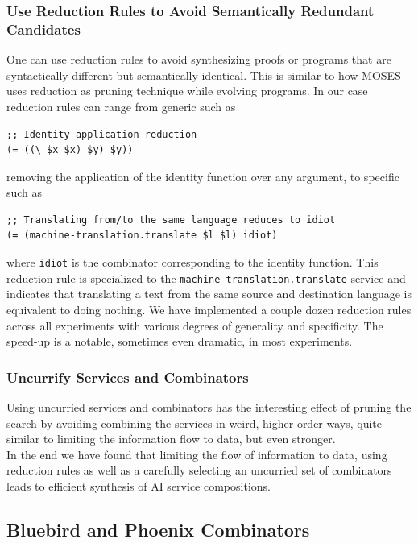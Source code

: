 \documentclass[]{report}
\begin{document}
\subsubsection{Use Reduction Rules to Avoid Semantically Redundant
  Candidates} One can use reduction rules to avoid synthesizing proofs
or programs that are syntactically different but semantically
identical.  This is similar to how MOSES~\cite{Looks2006} uses
reduction as pruning technique while evolving programs.  In our case
reduction rules can range from generic such as
\begin{verbatim}
;; Identity application reduction
(= ((\ $x $x) $y) $y))
\end{verbatim}
removing the application of the identity function over any argument,
to specific such as
\begin{verbatim}
;; Translating from/to the same language reduces to idiot
(= (machine-translation.translate $l $l) idiot)
\end{verbatim}
where \texttt{idiot} is the combinator corresponding to
the identity function.  This reduction rule is specialized to the
\texttt{machine-translation.translate} service and
indicates that translating a text from the same source and destination
language is equivalent to doing nothing. We have implemented a couple
dozen reduction rules across all experiments with various degrees of
generality and specificity.  The speed-up is a notable, sometimes even
dramatic, in most experiments.

\subsubsection{Uncurrify Services and Combinators}
Using uncurried services and combinators has the interesting effect of
pruning the search by avoiding combining the services in weird, higher
order ways, quite similar to limiting the information flow to data,
but even stronger.\\

In the end we have found that limiting the flow of information to
data, using reduction rules as well as a carefully selecting an
uncurried set of combinators leads to efficient synthesis of AI
service compositions.

\subsection{Bluebird and Phoenix Combinators}
\end{document}
